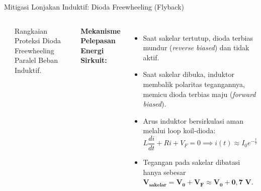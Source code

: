 \documentclass[aspectratio=169,10pt]{beamer}
\begin{document}
\begin{frame}{Mitigasi Lonjakan Induktif: Dioda Freewheeling (Flyback)}
  \begin{columns}
    \begin{center}
    \end{center}
    \vspace{-0.2cm}
    \begin{center}
      \footnotesize Rangkaian Proteksi Dioda Freewheeling Paralel Beban Induktif.
    \end{center}

    \textbf{Mekanisme Pelepasan Energi Sirkuit:}
    \begin{itemize}
      \item Saat sakelar tertutup, dioda terbias mundur (\textit{reverse biased}) dan tidak aktif.
      \item Saat sakelar dibuka, induktor membalik polaritas tegangannya, memicu dioda terbias maju (\textit{forward biased}).
      \item Arus induktor bersirkulasi aman melalui loop koil-dioda:
      \begin{equation*}
        L \frac{di}{dt} + R i + V_F = 0 \implies i(t) \approx I_0 e^{-\frac{t}{\tau}}
      \end{equation*}
      \item Tegangan pada sakelar dibatasi hanya sebesar $\mathbf{V_{\text{sakelar}} = V_0 + V_F \approx V_0 + 0{,}7\text{ V}}$.
    \end{itemize}
  \end{columns}
\end{frame}
\end{document}
